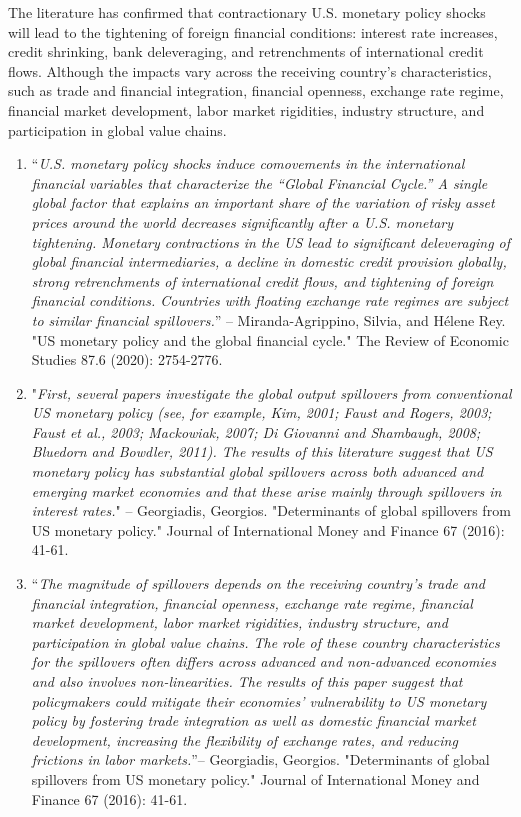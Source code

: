 \documentclass[12pt]{article}
\begin{document}
The literature has confirmed that contractionary U.S. monetary policy shocks will lead to the tightening of foreign financial conditions: interest rate increases, credit shrinking, bank deleveraging, and retrenchments of international credit flows. Although the impacts vary across the receiving country's characteristics, such as trade and financial integration, financial openness, exchange rate regime, financial market development, labor market rigidities, industry structure, and participation in global value chains.  

\begin{enumerate}

\item “\textit{U.S. monetary policy shocks induce comovements in the international financial variables that characterize the “Global Financial Cycle.” A single global factor that explains an important share of the variation of risky asset prices around the world decreases significantly after a U.S. monetary tightening. Monetary contractions in the US lead to significant deleveraging of global financial intermediaries, a decline in domestic credit provision globally, strong retrenchments of international credit flows, and tightening of foreign financial conditions. Countries with floating exchange rate regimes are subject to similar financial spillovers.}” -- Miranda-Agrippino, Silvia, and Hélene Rey. "US monetary policy and the global financial cycle." The Review of Economic Studies 87.6 (2020): 2754-2776.

\item "\textit{First, several papers investigate the global output spillovers from conventional US monetary policy (see, for example, Kim, 2001; Faust and Rogers, 2003; Faust et al., 2003; Mackowiak, 2007; Di Giovanni and Shambaugh, 2008; Bluedorn and Bowdler, 2011). The results of this literature suggest that US monetary policy has substantial global spillovers across both advanced and emerging market economies and that these arise mainly through spillovers in interest rates.}" -- Georgiadis, Georgios. "Determinants of global spillovers from US monetary policy." Journal of International Money and Finance 67 (2016): 41-61.

\item “\textit{The magnitude of spillovers depends on the receiving country's trade and financial integration, financial openness, exchange rate regime, financial market development, labor market rigidities, industry structure, and participation in global value chains. The role of these country characteristics for the spillovers often differs across advanced and non-advanced economies and also involves non-linearities. The results of this paper suggest that policymakers could mitigate their economies' vulnerability to US monetary policy by fostering trade integration as well as domestic financial market development, increasing the flexibility of exchange rates, and reducing frictions in labor markets.}”-- Georgiadis, Georgios. "Determinants of global spillovers from US monetary policy." Journal of International Money and Finance 67 (2016): 41-61.


\end{enumerate}
\end{document}
